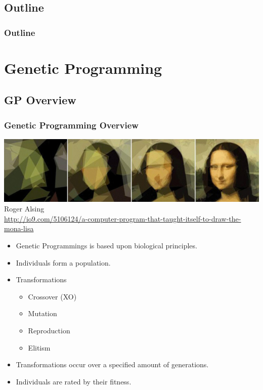 \documentclass{beamer}
\begin{document}
\subsection*{Outline}

\begin{frame}
  \frametitle{Outline}
  \tableofcontents[hideallsubsections]
\end{frame}

\section[Genetic Programming]{Genetic Programming}

\subsection{GP Overview}

\begin{frame}
  \frametitle{Genetic Programming Overview}
  \begin{center}
  \includegraphics[width=.60\textwidth]{mona_lisa.jpg} \\
  \tiny{Roger Alsing \\ \url{http://io9.com/5106124/a-computer-program-that-taught-itself-to-draw-the-mona-lisa} }

  \end{center}
 
  \begin{itemize}
  	\item Genetic Programmings is based upon biological principles.
	\item Individuals form a population.
	\item Transformations
		\begin{itemize}
		\item Crossover (XO)
		\item Mutation
		\item Reproduction
		\item Elitism
		\end{itemize}
	\item Transformations occur over a specified amount of generations.
	\item Individuals are rated by their fitness.
  \end{itemize}

 

\end{frame}
\end{document}
